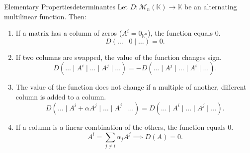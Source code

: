 \documentclass[11pt, a4paper]{article}
\begin{document}
\begin{proposicion}{Elementary Properties}{determinantes}
Let $D: \mathcal{M}_{n}(\mathbb{K}) \to \mathbb{K}$ be an alternating multilinear function. Then:

\begin{enumerate}
    \item
    If a matrix has a column of zeros ($A^i = 0_{\mathbb{K}^n}$), the function equals 0.
    \[ D(\dots \mid 0 \mid \dots) = 0. \]

    \item
    If two columns are swapped, the value of the function changes sign.
    \[ D(\dots \mid A^i \mid \dots \mid A^j \mid \dots) = - D(\dots \mid A^j \mid \dots \mid A^i \mid \dots). \]

    \item
    The value of the function does not change if a multiple of another, different column is added to a column.
    \[ D(\dots \mid A^i + \alpha A^j \mid \dots \mid A^j \mid \dots) = D(\dots \mid A^i \mid \dots \mid A^j \mid \dots). \]

    \item
    If a column is a linear combination of the others, the function equals 0.
    \[ A^i = \sum_{j \neq i} \alpha_j A^j \implies D(A) = 0. \]
\end{enumerate}
\end{proposicion}
\end{document}
